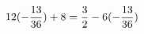 \documentclass[preview]{standalone}
\begin{document}
\begin{align*}
\special{dvisvgm:raw <g id='unique000'>}12(- \frac{13}{36}) + 8 = \frac{3}{2} - 6(- \frac{13}{36})\special{dvisvgm:raw </g>}
\end{align*}
\end{document}
